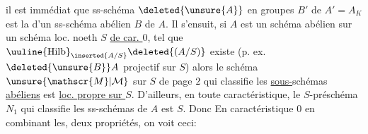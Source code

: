il est immédiat  que  ss-schéma
$\deleted{\unsure{A}}$ en groupes  $B'$ de $A'=A_K$ est
la  d'un  ss-schéma abélien
$B$ de $A$. Il s'ensuit, si 
$A$ est un schéma abélien   sur un
schéma loc. noeth $S$ \uline{de car. $0$},  tel
 que $\uuline{\mathrm{Hilb}}_{\inserted{A/S}}\deleted{(A/S)}$ existe 
(p. ex.    $\deleted{\unsure{B}}A$ projectif sur $S$) alors
le schéma $\unsure{\mathscr{M}|\mathcal{M}}$ sur $S$ de page $2$
 qui classifie les \uline{sous-}schémas \uline{abéliens}
 est
\uline{loc. propre sur $S$}. D'ailleurs, en
toute caractéristique, le $S$-préschéma $N_1$
qui classifie les ss-schémas   de
$A$ est     $S$. Donc
En caractéristique $0$ en combinant les,
deux  propriétés, on voit ceci:
